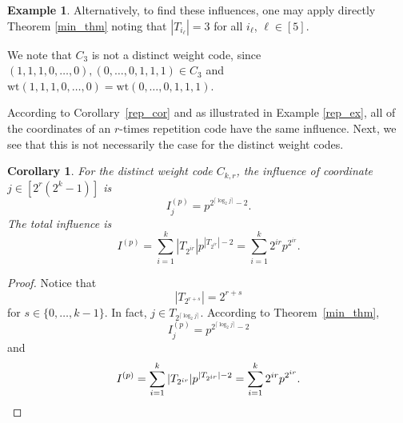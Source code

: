 \documentclass[12pt]{article}
\newcommand{\wt}{\mathrm{wt}}
\newtheorem{corollary}[theorem]{Corollary}
\theoremstyle{definition}
\newtheorem{example}[theorem]{Example}
\begin{document}
\begin{example}
Alternatively, to find these influences, one may apply directly Theorem \ref{min_thm} noting that $| T_{i_\ell} | =3$ for all $i_\ell$, $\ell \in [5]$.

We note that $C_3$ is not a distinct weight code, since $(1,1,1,0, \dots, 0),(0, \dots, 0, 1, 1, 1) \in C_3$ and $\wt (1,1,1,0, \dots, 0)= \wt(0, \dots, 0, 1, 1, 1)$.


\end{example}

According to Corollary~\ref{rep_cor} and as illustrated in Example \ref{rep_ex}, all of the coordinates of an $r$-times repetition code have the same influence. Next, we see that this is not necessarily the case for the distinct weight codes. 

\begin{corollary} \label{dwc_cor}
For the distinct weight code $C_{k,r}$, the influence of coordinate $j \in [2^r (2^{k}-1)]$ is
$$I_j^{(p)} = p^{2^{ \lceil \log_2j \rceil}-2}.
$$ 
The total influence is
$$I^{(p)}= \sum_{i=1}^k | T_{2^{ir}} | p^{| T_{2^{ir}} |-2} = \sum_{i=1}^k 2^{ir} p^{2^{ir}}.$$
\end{corollary}

\begin{proof}
Notice that $$| T_{2^{r+s}} | = 2^{r+s}$$ for $s\in \{ 0, \dots, k-1\}$. In fact, $j \in T_{2^{ \lceil \log_2j \rceil}}$. 
According to Theorem~\ref{min_thm}, $$
I_j^{(p)} = p^{2^{ \lceil \log_2j \rceil}-2}
$$ 
and 
\[I^{(p)}= \sum_{i=1}^k | T_{2^{ir}} | p^{| T_{2^{ir}} |-2} = \sum_{i=1}^k 2^{ir} p^{2^{ir}}. \qedhere\]
\end{proof}
\end{document}
